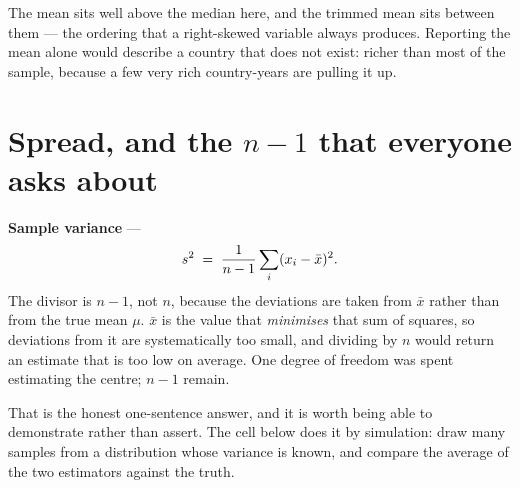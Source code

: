 \documentclass[
  letterpaper,
  10pt,
  twoside,
  openright,
  numbers=noenddot,
  chapterprefix=true]{scrbook}
\begin{document}
The mean sits well above the median here, and the trimmed mean sits
between them --- the ordering that a right-skewed variable always
produces. Reporting the mean alone would describe a country that does
not exist: richer than most of the sample, because a few very rich
country-years are pulling it up.

\section{\texorpdfstring{Spread, and the \(n-1\) that everyone asks
about}{Spread, and the n-1 that everyone asks about}}\label{spread-and-the-n-1-that-everyone-asks-about}

\begin{qmibdefinition}

{\textbf{Sample variance}} --- \[
s^2 \thickspace=\thickspace \frac{1}{n-1}\sum_i (x_i - \bar x)^2 .
\] The divisor is \(n-1\), not \(n\), because the deviations are taken
from \(\bar x\) rather than from the true mean \(\mu\). \(\bar x\) is
the value that \emph{minimises} that sum of squares, so deviations from
it are systematically too small, and dividing by \(n\) would return an
estimate that is too low on average. One degree of freedom was spent
estimating the centre; \(n-1\) remain.

\end{qmibdefinition}

That is the honest one-sentence answer, and it is worth being able to
demonstrate rather than assert. The cell below does it by simulation:
draw many samples from a distribution whose variance is known, and
compare the average of the two estimators against the truth.
\end{document}
